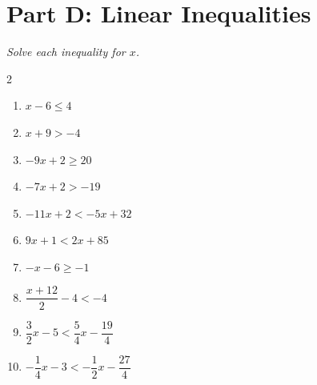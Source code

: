 \documentclass[11pt]{article}
\begin{document}
\section*{Part D: Linear Inequalities}
\noindent\textit{Solve each inequality for $x$.}
\begin{multicols}{2}
\begin{enumerate}
  \item $x - 6 \le 4$
  \vspace{1.8cm}
  \item $x + 9 > -4$
  \vspace{1.8cm}
  \item $-9x + 2 \ge 20$
  \vspace{1.8cm}
  \item $-7x + 2 > -19$
  \vspace{1.8cm}
  \item $-11x + 2 < -5x + 32$
  \vspace{1.8cm}
  \item $9x + 1 < 2x + 85$
  \vspace{1.8cm}
  \item $-x - 6 \ge -1$
  \vspace{1.8cm}
  \item $\dfrac{x + 12}{2} - 4 < -4$
  \vspace{1.8cm}
  \item $\dfrac{3}{2}x - 5 < \dfrac{5}{4}x - \dfrac{19}{4}$
  \vspace{1.8cm}
  \item $-\dfrac{1}{4}x - 3 < -\dfrac{1}{2}x - \dfrac{27}{4}$
  \vspace{1.8cm}
\end{enumerate}
\end{multicols}
\end{document}
